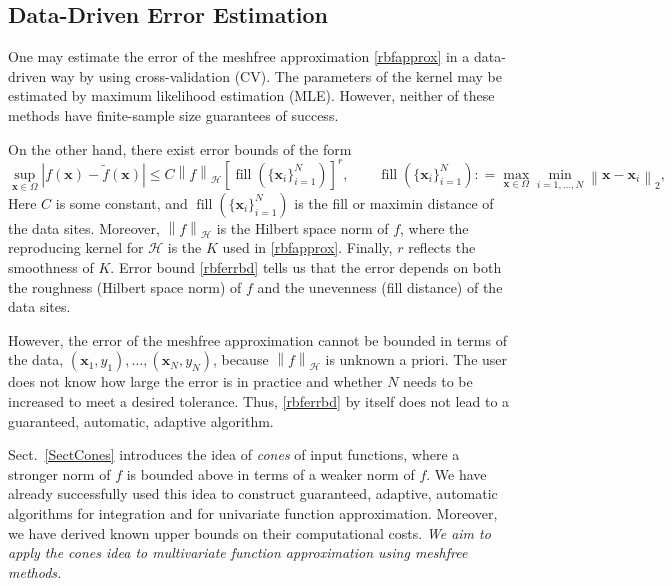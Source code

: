 \documentclass[11pt]{NSFamsart}
\newcommand{\tf}{\tilde{f}}
\newcommand{\bx}{{\boldsymbol{x}}}
\newcommand{\cx}{{\Omega}}
\def\abs#1{\ensuremath{\left \lvert #1 \right \rvert}}
\newcommand{\norm}[2][{}]{\ensuremath{\left \lVert #2 \right \rVert}_{#1}}
\DeclareMathOperator{\filldis}{fill}
\newcommand{\desn}{\{\bx_i\}_{i=1}^N}
\newcommand{\ch}{\mathcal{H}}
\begin{document}
\vspace{2cm}

\subsection*{Data-Driven Error Estimation} One may estimate the error of the meshfree approximation \eqref{rbfapprox} in a data-driven way by using cross-validation (CV).  The parameters of the kernel may be estimated by maximum likelihood estimation (MLE).  However, neither of these methods have finite-sample size guarantees of success.

On the other hand, there exist error bounds of the form \citep{Wen05a}
\begin{equation} \label{rbferrbd}
\sup_{\bx \in \cx} \abs{f(\bx) - \tf(\bx)} \le C \norm[\ch]{f} [\filldis(\desn)]^r, \qquad \filldis(\desn): = \max_{\bx \in \cx} \min_{i=1,  \ldots, N} \norm[2]{\bx - \bx_i},
\end{equation}
Here $C$ is some constant, and $\filldis(\{\bx_i\}_{i=1}^N)$ is the fill or maximin distance of the data sites.  Moreover, $\norm[\ch]{f}$ is the Hilbert space norm of $f$, where the reproducing kernel for $\ch$ is the $K$ used in \eqref{rbfapprox}. Finally, $r$ reflects the smoothness of $K$.  Error bound \eqref{rbferrbd} tells us that the error depends on both the roughness (Hilbert space norm) of $f$ and the unevenness (fill distance) of the data sites.

However, the error of the meshfree approximation cannot be bounded in terms of the data, $(\bx_1, y_1), \ldots, (\bx_N,y_N)$, because $\norm[\ch]{f}$ is unknown a priori.  The user does not know how large the error is in practice and whether $N$ needs to be increased to meet a desired tolerance. Thus, \eqref{rbferrbd} by itself does not lead to a guaranteed, automatic, adaptive algorithm.

Sect.\ \ref{SectCones} introduces the idea of \emph{cones} of input functions, where a stronger norm of $f$ is bounded above in terms of a weaker norm of $f$.  We have already successfully used this idea to construct guaranteed, adaptive, automatic algorithms for integration and for univariate function approximation.  Moreover, we have derived known upper bounds on their computational costs. \emph{We aim to apply the cones idea to multivariate function approximation using meshfree methods.}
\end{document}
